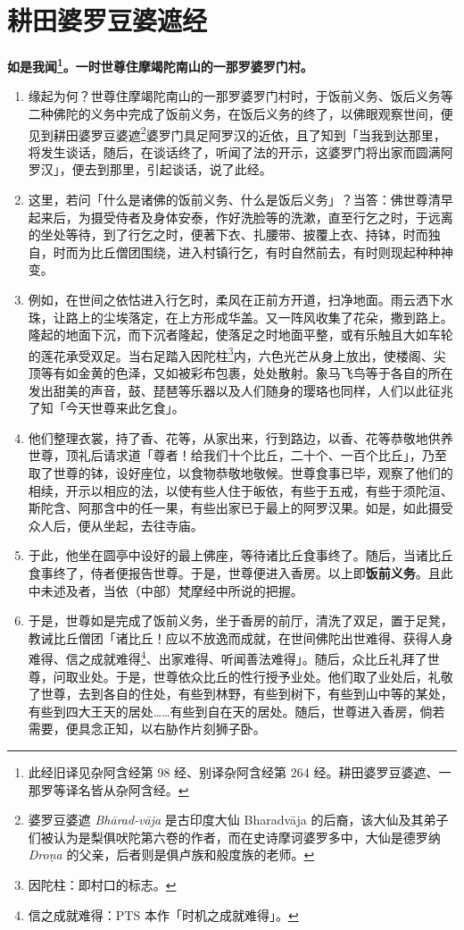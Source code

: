 \section{耕田婆罗豆婆遮经}

\textbf{如是我闻\footnote{此经旧译见杂阿含经第 98 经、别译杂阿含经第 264 经。耕田婆罗豆婆遮、一那罗等译名皆从杂阿含经。}。一时世尊住摩竭陀南山的一那罗婆罗门村。}

\begin{enumerate}\item 缘起为何？世尊住摩竭陀南山的一那罗婆罗门村时，于饭前义务、饭后义务等二种佛陀的义务中完成了饭前义务，在饭后义务的终了，以佛眼观察世间，便见到耕田婆罗豆婆遮\footnote{婆罗豆婆遮 \textit{Bhārad-vāja} 是古印度大仙 Bharadvāja 的后裔，该大仙及其弟子们被认为是梨俱吠陀第六卷的作者，而在史诗摩诃婆罗多中，大仙是德罗纳 \textit{Droṇa} 的父亲，后者则是俱卢族和般度族的老师。}婆罗门具足阿罗汉的近依，且了知到「当我到达那里，将发生谈话，随后，在谈话终了，听闻了法的开示，这婆罗门将出家而圆满阿罗汉」，便去到那里，引起谈话，说了此经。
\item 这里，若问「什么是诸佛的饭前义务、什么是饭后义务」？当答：佛世尊清早起来后，为摄受侍者及身体安泰，作好洗脸等的洗漱，直至行乞之时，于远离的坐处等待，到了行乞之时，便著下衣、扎腰带、披覆上衣、持钵，时而独自，时而为比丘僧团围绕，进入村镇行乞，有时自然前去，有时则现起种种神变。
\item 例如，在世间之依怙进入行乞时，柔风在正前方开道，扫净地面。雨云洒下水珠，让路上的尘埃落定，在上方形成华盖。又一阵风收集了花朵，撒到路上。隆起的地面下沉，而下沉者隆起，使落足之时地面平整，或有乐触且大如车轮的莲花承受双足。当右足踏入因陀柱\footnote{因陀柱：即村口的标志。}内，六色光芒从身上放出，使楼阁、尖顶等有如金黄的色泽，又如被彩布包裹，处处散射。象马飞鸟等于各自的所在发出甜美的声音，鼓、琵琶等乐器以及人们随身的璎珞也同样，人们以此征兆了知「今天世尊来此乞食」。
\item 他们整理衣裳，持了香、花等，从家出来，行到路边，以香、花等恭敬地供养世尊，顶礼后请求道「尊者！给我们十个比丘，二十个、一百个比丘」，乃至取了世尊的钵，设好座位，以食物恭敬地敬候。世尊食事已毕，观察了他们的相续，开示以相应的法，以使有些人住于皈依，有些于五戒，有些于须陀洹、斯陀含、阿那含中的任一果，有些出家已于最上的阿罗汉果。如是，如此摄受众人后，便从坐起，去往寺庙。
\item 于此，他坐在圆亭中设好的最上佛座，等待诸比丘食事终了。随后，当诸比丘食事终了，侍者便报告世尊。于是，世尊便进入香房。以上即\textbf{饭前义务}。且此中未述及者，当依（中部）梵摩经中所说的把握。
\item 于是，世尊如是完成了饭前义务，坐于香房的前厅，清洗了双足，置于足凳，教诫比丘僧团「诸比丘！应以不放逸而成就，在世间佛陀出世难得、获得人身难得、信之成就难得\footnote{信之成就难得：PTS 本作「时机之成就难得」。}、出家难得、听闻善法难得」。随后，众比丘礼拜了世尊，问取业处。于是，世尊依众比丘的性行授予业处。他们取了业处后，礼敬了世尊，去到各自的住处，有些到林野，有些到树下，有些到山中等的某处，有些到四大王天的居处……有些到自在天的居处。随后，世尊进入香房，倘若需要，便具念正知，以右胁作片刻狮子卧。

\end{enumerate}
